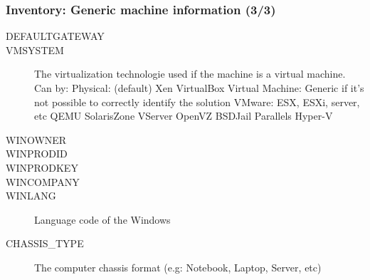 \documentclass{beamer}
\begin{document}
\begin{frame}
\frametitle{Inventory: Generic machine information  (3/3)}
\begin{description}
      \item[DEFAULTGATEWAY]
      \item[VMSYSTEM] The virtualization technologie used if the machine is a virtual machine.
 Can by:
 Physical: (default) Xen VirtualBox Virtual Machine: Generic if it's not possible to correctly identify the solution VMware: ESX, ESXi, server, etc QEMU SolarisZone VServer OpenVZ BSDJail Parallels Hyper-V
      \item[WINOWNER]
      \item[WINPRODID]
      \item[WINPRODKEY]
      \item[WINCOMPANY] 
      \item[WINLANG] Language code of the Windows
      \item[CHASSIS\_TYPE] The computer chassis format (e.g: Notebook, Laptop, Server, etc)
\end{description}
\end{frame}
\end{document}
